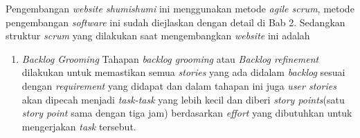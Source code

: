 \documentclass[a4paper]{article}
\begin{document}
Pengembangan \textit{website shumishumi} ini menggunakan metode \textit{agile scrum}, metode pengembangan \textit{software} ini sudah diejlaskan dengan detail di Bab 2. Sedangkan struktur \textit{scrum} yang dilakukan saat mengembangkan \textit{website} ini adalah
\begin{enumerate}
    \item \textit{Backlog Grooming}
    Tahapan \textit{backlog grooming} atau \textit{Backlog refinement} dilakukan untuk memastikan semua \textit{stories} yang ada didalam \textit{backlog} sesuai dengan \textit{requirement} yang didapat dan dalam tahapan ini juga \textit{user stories} akan dipecah menjadi \textit{task-task} yang lebih kecil dan diberi \textit{story points}(satu \textit{story point} sama dengan tiga jam) berdasarkan \textit{effort} yang dibutuhkan untuk mengerjakan \textit{task} tersebut.


\end{enumerate}
\end{document}
